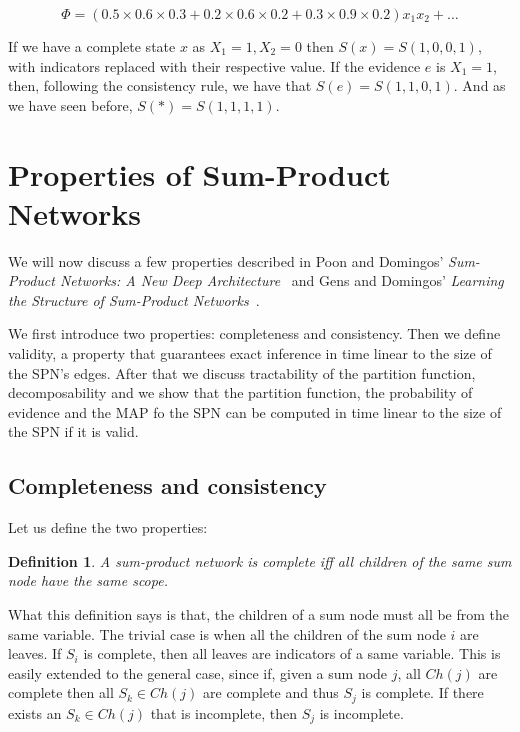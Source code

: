 \documentclass[a4paper,10pt]{article}
\theoremstyle{plain}
\newtheorem*{spn-def}{Definition}
\begin{document}
\begin{equation*}
  \Phi = (0.5\times0.6\times0.3+0.2\times0.6\times0.2+0.3\times0.9\times0.2)x_1x_2+\ldots
\end{equation*}

If we have a complete state $x$ as $X_1=1,X_2=0$ then $S(x)=S(1,0,0,1)$, with indicators replaced
with their respective value. If the evidence $e$ is $X_1=1$, then, following the consistency rule,
we have that $S(e)=S(1,1,0,1)$. And as we have seen before, $S(*)=S(1,1,1,1)$.

\section{Properties of Sum-Product Networks}

We will now discuss a few properties described in Poon and Domingos' \textit{Sum-Product Networks:
A New Deep Architecture}~\cite{poon-domingos} and Gens and Domingos' \textit{Learning the Structure
of Sum-Product Networks}~\cite{gens-domingos}.

We first introduce two properties: completeness and consistency. Then we define validity, a
property that guarantees exact inference in time linear to the size of the SPN's edges. After that
we discuss tractability of the partition function, decomposability and we show that the partition
function, the probability of evidence and the MAP fo the SPN can be computed in time linear to the
size of the SPN if it is valid.

\subsection{Completeness and consistency}

Let us define the two properties:

\begin{spn-def}
  A sum-product network is complete iff all children of the same sum node have the same scope.
\end{spn-def}

What this definition says is that, the children of a sum node must all be from the same variable.
The trivial case is when all the children of the sum node $i$ are leaves. If $S_i$ is complete,
then all leaves are indicators of a same variable. This is easily extended to the general case,
since if, given a sum node $j$, all $Ch(j)$ are complete then all $S_k\in Ch(j)$ are complete and
thus $S_j$ is complete. If there exists an $S_k\in Ch(j)$ that is incomplete, then $S_j$ is
incomplete.
\end{document}
